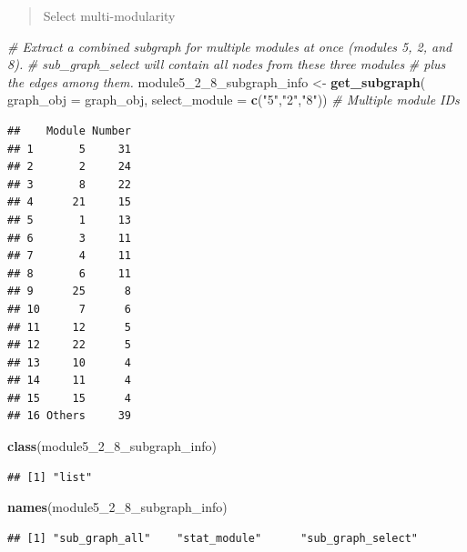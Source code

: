 \documentclass[
]{book}
\newenvironment{Shaded}{\begin{snugshade}}{\end{snugshade}}
\newcommand{\AttributeTok}[1]{\textcolor[rgb]{0.13,0.29,0.53}{#1}}
\newcommand{\CommentTok}[1]{\textcolor[rgb]{0.56,0.35,0.01}{\textit{#1}}}
\newcommand{\FunctionTok}[1]{\textcolor[rgb]{0.13,0.29,0.53}{\textbf{#1}}}
\newcommand{\NormalTok}[1]{#1}
\newcommand{\OtherTok}[1]{\textcolor[rgb]{0.56,0.35,0.01}{#1}}
\newcommand{\SpecialCharTok}[1]{\textcolor[rgb]{0.81,0.36,0.00}{\textbf{#1}}}
\newcommand{\StringTok}[1]{\textcolor[rgb]{0.31,0.60,0.02}{#1}}
\begin{document}
\begin{quote}
Select multi-modularity
\end{quote}

\begin{Shaded}
\begin{Highlighting}[]
\CommentTok{\# Extract a combined subgraph for multiple modules at once (modules 5, 2, and 8).}
\CommentTok{\# \textasciigrave{}sub\_graph\_select\textasciigrave{} will contain all nodes from these three modules}
\CommentTok{\# plus the edges among them.}
\NormalTok{module5\_2\_8\_subgraph\_info }\OtherTok{\textless{}{-}} \FunctionTok{get\_subgraph}\NormalTok{(}
  \AttributeTok{graph\_obj     =}\NormalTok{ graph\_obj,}
  \AttributeTok{select\_module =} \FunctionTok{c}\NormalTok{(}\StringTok{"5"}\NormalTok{,}\StringTok{"2"}\NormalTok{,}\StringTok{"8"}\NormalTok{))  }\CommentTok{\# Multiple module IDs}
\end{Highlighting}
\end{Shaded}

\begin{verbatim}
##    Module Number
## 1       5     31
## 2       2     24
## 3       8     22
## 4      21     15
## 5       1     13
## 6       3     11
## 7       4     11
## 8       6     11
## 9      25      8
## 10      7      6
## 11     12      5
## 12     22      5
## 13     10      4
## 14     11      4
## 15     15      4
## 16 Others     39
\end{verbatim}

\begin{Shaded}
\begin{Highlighting}[]
\FunctionTok{class}\NormalTok{(module5\_2\_8\_subgraph\_info)}
\end{Highlighting}
\end{Shaded}

\begin{verbatim}
## [1] "list"
\end{verbatim}

\begin{Shaded}
\begin{Highlighting}[]
\FunctionTok{names}\NormalTok{(module5\_2\_8\_subgraph\_info)}
\end{Highlighting}
\end{Shaded}

\begin{verbatim}
## [1] "sub_graph_all"    "stat_module"      "sub_graph_select"
\end{verbatim}

\begin{Shaded}
\end{Shaded}
\end{document}
